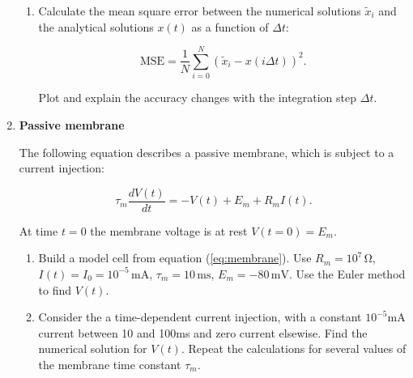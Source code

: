 \documentclass[12pt, a4]{article}
\begin{document}
\begin{enumerate}
\begin{enumerate}
        \item Calculate the mean square error between the
        numerical solutions $\tilde{x}_i$ and the analytical solutions $x(t)$
        as a function of $\Delta t$:
     
        \begin{equation}
            \mathrm{MSE}=\frac{1}{N}
            \sum_{i=0}^N (\tilde{x}_i-x(i\Delta t))^2.  \label{eq:MSE}
        \end{equation}
     
        Plot and explain the accuracy changes with the integration step
        $\Delta t$.
    \end{enumerate}


    \item \textbf{Passive membrane} \label{ex:membrane}

    The following equation describes a passive membrane, which is subject to a
    current injection:

    \begin{equation}
        \tau_m \frac{dV(t)}{dt}=-V(t)+E_m+R_mI(t).
        \label{eq:membrane}
    \end{equation} 

    At time $t=0$ the membrane voltage is at rest $V(t=0)=E_m$.

    \begin{enumerate}
        \item Build a model cell from equation (\ref{eq:membrane}). Use
            $R_m=10^7\,\mathrm{ \Omega}$, $I(t)=I_0=10^{-5}\,\mathrm{ mA}$,
            $\tau_m=10\,\mathrm{ms}$, $E_m=-80\,\mathrm{mV}$. Use the Euler
            method to find $V(t)$.
        \item Consider the a time-dependent current injection, with a constant
            $10^{-5}\mathrm{mA}$ current between 10 and 100ms and zero current
            elsewise.
        Find the numerical solution for $V(t)$. Repeat the calculations for
        several values of the membrane time constant $\tau_m$.
    \end{enumerate}


\end{enumerate}
\end{document}

